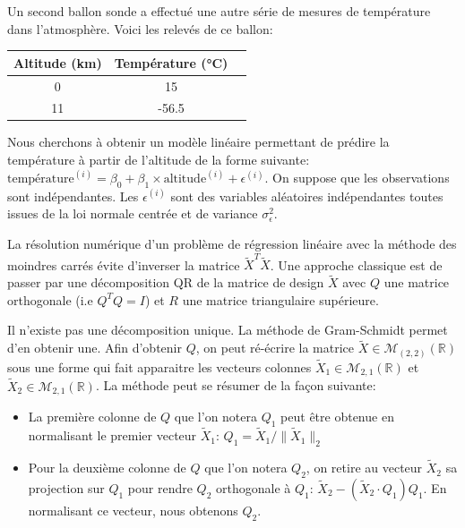 \documentclass[solutions]{../exercices}
\begin{document}
\begin{exercice}
Un second ballon sonde a effectué une autre série de mesures de température dans l'atmosphère. Voici les relevés de ce ballon:

\begin{center}
	\begin{tabular}{|c|c|c|}
		\hline
		\textbf{Altitude} (km) & \textbf{Température} (°C) \\ \hline
		0 & 15 \\
		11 & -56.5 \\
		\hline
	\end{tabular}
\end{center}

Nous cherchons à obtenir un modèle linéaire permettant de prédire la température à partir de l'altitude de la forme suivante:  $\text{température}^{(i)} = \beta_0 + \beta_1 \times \text{altitude}^{(i)} + \epsilon^{(i)}$. On suppose que les observations sont indépendantes. Les $\epsilon^{(i)}$ sont des variables aléatoires indépendantes toutes issues de la loi normale centrée et de variance $\sigma_{\epsilon}^2$.

La résolution numérique d'un problème de régression linéaire avec la méthode des moindres carrés évite d'inverser la matrice $\tilde{X}^T \tilde{X}$. Une approche classique est de passer par une décomposition QR de la matrice de design $\tilde{X}$ avec $Q$ une matrice orthogonale (i.e $Q^T Q = I$) et $R$ une matrice triangulaire supérieure.

Il n'existe pas une décomposition unique. La méthode de Gram-Schmidt permet d'en obtenir une. Afin d'obtenir $Q$, on peut ré-écrire la matrice $\tilde{X} \in \mathcal{M}_{(2,2)}(\mathbb{R})$ sous une forme qui fait apparaitre les vecteurs colonnes $\tilde{X}_1 \in \mathcal{M}_{2,1}(\mathbb{R})$ et $\tilde{X}_2 \in \mathcal{M}_{2,1}(\mathbb{R})$. La méthode peut se résumer de la façon suivante:
\begin{itemize}
	\item La première colonne de $Q$ que l'on notera $Q_1$ peut être obtenue en normalisant le premier vecteur $\tilde{X}_1$: $Q_1 = \tilde{X}_1 / \|\tilde{X}_1\|_2$
	\item Pour la deuxième colonne de $Q$ que l'on notera $Q_2$, on retire au vecteur $\tilde{X}_2$ sa projection sur $Q_1$ pour rendre $Q_2$ orthogonale à $Q_1$: $\tilde{X}_2 - (\tilde{X}_2 \cdot Q_1) Q_1$. En normalisant ce vecteur, nous obtenons $Q_2$.
\end{itemize}


\end{exercice}
\end{document}
